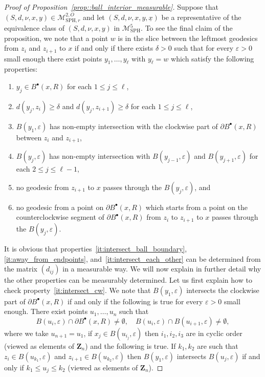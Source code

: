 \documentclass[10pt]{amsart}
\let\mathcal\mathscr
\newcommand{\sbullet}{{\scriptscriptstyle\bullet}}
\let\epsilon\varepsilon
\theoremstyle{plain}
\numberwithin{theorem}{section}
\theoremstyle{definition}
\newcommand\gmsspace{{\mathcal M}_{\mathrm{SPH}}}
\newcommand\gmsspacer{{\mathcal M}_{\mathrm{SPH},r}}
\newcommand{\Z}{\mathbf{Z}}
\let\ul\underline
\newcommand{\fb}[2]{B^\sbullet(#1,#2)}
\begin{document}
\begin{proof}[Proof of Proposition~\ref{prop::ball_interior_measurable}]
Suppose that $(S,d,\nu,x,y) \in \gmsspacer^{2,O}$ and let $(S,d,\nu,x,y,\ul{x})$ be a representative of the equivalence class of $(S,d,\nu,x,y)$ in $\gmsspace^5$. To see the final claim of the proposition, we note that a point $w$ is in the slice between the leftmost geodesics from $z_i$ and $z_{i+1}$ to $x$ if and only if there exists $\delta > 0$ such that for every $\epsilon > 0$ small enough there exist points $y_1,\ldots,y_\ell$ with $y_\ell = w$ which satisfy the following properties:
\begin{enumerate}
\item\label{it:intersect_ball_boundary} $y_j \in \fb{x}{R}$ for each $1 \leq j \leq \ell$,
\item\label{it:away_from_endpoints} $d(y_j,z_i) \geq \delta$ and $d(y_j,z_{i+1}) \geq \delta$ for each $1 \leq j \leq \ell$,
\item\label{it:intersect_cw} $B(y_1,\epsilon)$ has non-empty intersection with the clockwise part of $\partial \fb{x}{R}$ between $z_i$ and $z_{i+1}$,
\item\label{it:intersect_each_other} $B(y_j,\epsilon)$ has non-empty intersection with $B(y_{j-1},\epsilon)$ and $B(y_{j+1},\epsilon)$ for each $2 \leq j \leq \ell-1$,
\item\label{it::no_geodesic_i_plus_1} no geodesic from $z_{i+1}$ to $x$ passes through the $B(y_j,\epsilon)$, and
\item\label{it::no_geodesic_i} no geodesic from a point on $\partial \fb{x}{R}$ which starts from a point on the counterclockwise segment of $\partial \fb{x}{R}$ from $z_i$ to $z_{i+1}$ to $x$ passes through the $B(y_j,\epsilon)$.
\end{enumerate}
It is obvious that properties~\ref{it:intersect_ball_boundary}, \ref{it:away_from_endpoints}, and~\ref{it:intersect_each_other} can be determined from the matrix $(d_{ij})$ in a measurable way. We will now explain in further detail why the other properties can be measurably determined. Let us first explain how to check property~\ref{it:intersect_cw}. We note that $B(y_1,\epsilon)$ intersects the clockwise part of $\partial \fb{x}{R}$ if and only if the following is true for every $\epsilon > 0$ small enough. There exist points $u_1,\ldots,u_n$ such that
\[
B(u_i,\epsilon) \cap \partial \fb{x}{R} \neq \emptyset,\quad B(u_i,\epsilon) \cap B(u_{i+1},\epsilon) \neq \emptyset,
\]
where we take $u_{n+1} = u_1$, if $x_j \in B(u_{i_j},\epsilon)$ then $i_1,i_2,i_3$ are in cyclic order (viewed as elements of $\Z_n$) and the following is true. If $k_1,k_2$ are such that $z_i \in B(u_{k_1},\epsilon)$ and $z_{i+1} \in B(u_{k_2},\epsilon)$ then $B(y_1,\epsilon)$ intersects $B(u_j,\epsilon)$ if and only if $k_1 \leq u_j \leq k_2$ (viewed as elements of $\Z_n$).

\end{proof}
\end{document}
